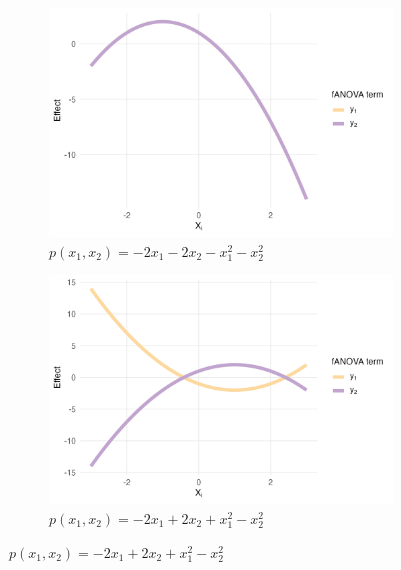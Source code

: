 \begin{figure}[htpb]
    \centering
    \begin{subfigure}[t]{0.49\textwidth}
        \centering
        \includegraphics[width=\textwidth]{images/experiment_section/mixed_a1m20_a2m20_a11m10_a22m10_a12p00_rhop00_main.png}
        \caption{$p(x_1, x_2) = -2 x_1 - 2 x_2 - x_1^2 - x_2^2$}
        \label{fig:mixed_rho_0_panel1}
    \end{subfigure}%
    \hfill
    \begin{subfigure}[t]{0.49\textwidth}
        \centering
        \includegraphics[width=\textwidth]{images/experiment_section/mixed_a1m20_a2p20_a11p10_a22m10_a12p00_rhop00_main.png}
        \caption{$p(x_1, x_2) = -2 x_1 + 2 x_2 + x_1^2 - x_2^2$}
        \label{fig:mixed_rho_0_panel2}
    \end{subfigure}


\end{figure}
